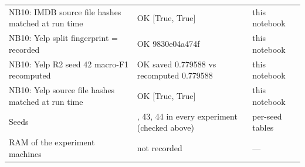 \begin{table}[h]
\begin{tabularx}{\textwidth}{>{\raggedright\arraybackslash}X>{\raggedright\arraybackslash}X>{\raggedright\arraybackslash}X}
NB10: IMDB source file hashes matched at run time & OK [True, True] & this notebook \\
NB10: Yelp split fingerprint = recorded & OK 9830e04a474f & this notebook \\
NB10: Yelp R2 seed 42 macro-F1 recomputed & OK saved 0.779588 vs recomputed 0.779588 & this notebook \\
NB10: Yelp source file hashes matched at run time & OK [True, True] & this notebook \\
Seeds & 42, 43, 44 in every experiment (checked above) & per-seed tables \\
RAM of the experiment machines & not recorded & — \\
\bottomrule
\end{tabularx}
\end{table}
